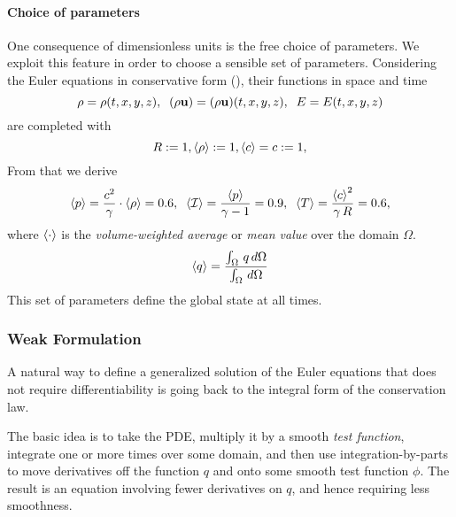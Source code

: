 \paragraph{Choice of parameters} One consequence of dimensionless units is the
free choice of parameters. We exploit this feature in order to choose a
sensible set of parameters. Considering the Euler equations in conservative
form (), their functions in space and time
\begin{equation}
\rho = \rho(t,x,y,z), \;\;(\rho\mathbf{u}) = (\rho\mathbf{u})(t,x,y,z),\;\;E = E(t,x,y,z)
\end{equation}
are completed with
\begin{equation}
\label{eqn:parameter-choice-completion}
    R := 1, \langle\rho\rangle := 1,\langle c\rangle = c := 1,
\end{equation}
From that we derive
\begin{equation}
\langle p\rangle = \frac{c^2}{\gamma}\cdot\langle\rho\rangle = 0.6,\;\;
\langle\mathcal{I}\rangle = \frac{\langle p\rangle}{\gamma -1} = 0.9,\;\;
\langle T\rangle = \frac{\left\langle c\right\rangle^2}{\gamma\,R} = 0.6,
\end{equation}
where $\left\langle\cdot\right\rangle$ is the \emph{volume-weighted average} or \emph{mean value}
over the domain $\Omega$.
\begin{equation}
\label{eqn:domain-average}
    \left\langle q\right\rangle = \frac{\int_\Omega\,q\,d\Omega}{\int_\Omega\,d\Omega}
\end{equation}
This set of parameters define the global state at all times.

\subsubsection{Weak Formulation}
A natural way to define a generalized solution of the Euler equations that does
not require differentiability is going back to the integral form of the
conservation law.

The basic idea is to take the PDE, multiply it by a smooth \emph{test
function}, integrate one or more times over some domain, and then use
integration-by-parts to move derivatives off the function $q$ and onto some
smooth test function $\phi$. The result is an equation involving fewer
derivatives on $q$, and hence requiring less smoothness.

